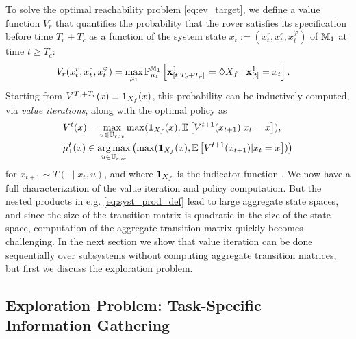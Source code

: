 \documentclass[conference]{IEEEtran}
\renewcommand{\cite}[1]{\citep{#1}}
\begin{document}
To solve the optimal reachability problem \eqref{eq:ev_target}, we define a value function $V_r$ that quantifies the probability that the rover satisfies its specification before time $T_r + T_c$ as a function of the system state $x_{t}:=(x_{t}^r, x_{t}^e, x_{t}^\varphi)$ of $\mathbb{M}_1$ at time $t\geq T_c$:
\begin{equation}
\label{eq:rovervalue}
\begin{aligned}
	& V_r(x_{t}^r, x_{t}^e, x_{t}^\varphi)  = \max_{\mu_1} \mathbb{P}_{\mu_1}^{\MDP_1} \left[\mathbf{x}^1_{[t,T_c+T_r]} \models \lozenge X_f \mid \mathbf{x}_{[t]}^1 = x_{t} \right].
\end{aligned}
\end{equation}
Starting from $ V^{T_c+T_r}(x)\equiv \mathbf{1}_{X_f}(x)$, this probability can be inductively computed, via \emph{value iterations}, along with the optimal policy as
\begin{subequations}
\label{eq:value_iter_mission}
  \begin{align}
    & V^{t}(x)  = \max_{u \in \U_{rov}}  \max( \ind_{X_f}(x), \mathbb{E}\left[V^{t+1}(x_{t+1}){\mid} x_t=x\right] ) \label{eq:iter_mission}, \\
    & \pol_1^t(x) \in \argmax_{u\in \U_{rov}} \left(\max( \ind_{X_f}(x), \mathbb{E}\left[V^{t+1}(x_{t+1}){\mid }x_t=x\right] ) \right)%
    \end{align}
\end{subequations}
for $x_{t+1}\sim  T(\cdot \mid x_t, u)$, and where $\mathbf{1}_{X_f}$ is the indicator function \cite{Abate2008}.
%
We now have a full characterization of the value iteration and policy computation. But the nested products in e.g. \eqref{eq:syst_prod_def} lead to large aggregate state spaces, and since the size of the transition matrix is quadratic in the size of the state space, computation of the aggregate transition matrix quickly becomes challenging. In the next section we show that value iteration can be done sequentially over subsystems without computing aggregate transition matrices, but first we discuss the exploration problem.

\subsection{Exploration Problem: Task-Specific Information Gathering}
\label{sub:information}
\end{document}
